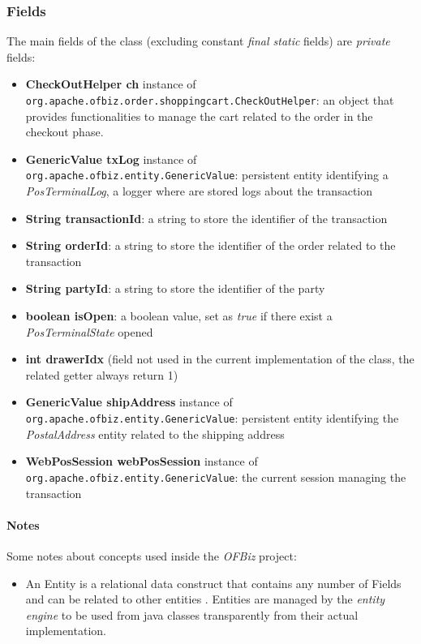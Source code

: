 \subsubsection{Fields}
The main fields of the class (excluding constant \emph{final static} fields)  are \emph{private} fields:

\begin{itemize}
    \item \textbf{CheckOutHelper ch} instance of \\ \texttt{org.apache.ofbiz.order.shoppingcart.CheckOutHelper}: an object that provides functionalities to manage the cart related to the order in the checkout phase.
    \item \textbf{GenericValue txLog} instance of \\ \texttt{org.apache.ofbiz.entity.GenericValue}: persistent entity identifying a \emph{PosTerminalLog}, a logger where are stored logs about the transaction
    \item \textbf{String transactionId}: a string to store the identifier of the transaction
    \item \textbf{String orderId}: a string to store the identifier of the order related to the transaction
    \item \textbf{String partyId}: a string to store the identifier of the party
    \item \textbf{boolean isOpen}: a boolean value, set as \emph{true} if there exist a \emph{PosTerminalState} opened
    \item \textbf{int drawerIdx} (field not used in the current implementation of the class, the related getter always return 1)
    \item \textbf{GenericValue shipAddress} instance of \\ \texttt{org.apache.ofbiz.entity.GenericValue}: persistent entity identifying the \emph{PostalAddress} entity related to the shipping address
    \item \textbf{WebPosSession webPosSession} instance of \\ \texttt{org.apache.ofbiz.entity.GenericValue}: the current session managing the transaction
\end{itemize}

\paragraph{Notes} Some notes about concepts used inside the \emph{OFBiz} project:
\begin{itemize}
 	\item An Entity is a relational data construct that contains any number of Fields and can be related to other entities \cite{OFBiz}. Entities are managed by the \emph{entity engine} to be used from java classes transparently from their actual implementation.
\end{itemize}

